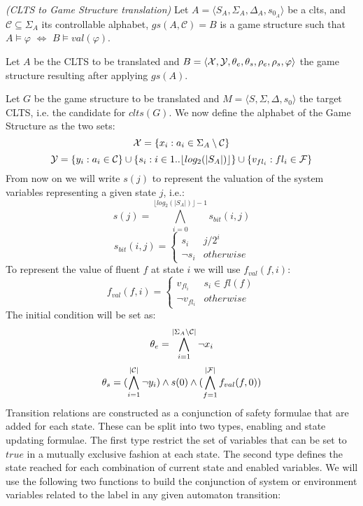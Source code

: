 \begin{definition}
	\label{def:clts_to_gs_translation} \emph{(CLTS to Game Structure translation)} 
	Let $A = \langle S_A, \Sigma_A, \Delta_A, s_{0_A} \rangle$ be a clts, and $\mathcal{C}\subseteq \Sigma_A$ its controllable alphabet, $gs(A,\mathcal{C})=B$ is a game structure such that $A \models \varphi$ $\iff$ $B \models val(\varphi)$.
\end{definition}

Let $A$ be the CLTS to be translated and $B =  \langle {\mathcal{X}}, {\mathcal{Y}}, {\theta_e}, {\theta_s}, {\rho_e}, {\rho_s}, \varphi \rangle$ the game structure resulting after applying $gs(A)$. 

Let $G$ be the game structure to be translated and $M=\langle S, \Sigma, \Delta, s_0 \rangle$ the target CLTS, i.e. the candidate for $clts(G)$.  We now define the alphabet of the Game Structure as the two sets:
\[{\mathcal{X}} = \{x_i : a_i \in \Sigma_A \setminus \mathcal{C} \}\]
\[{\mathcal{Y}} = \{y_i : a_i \in \mathcal{C} \} \cup \{s_i : i \in 1..\lfloor log_2(|S_A|)\rfloor \} \cup \{v_{fl_i} : fl_i \in \mathcal{F}\}\]
From now on we will write $s(j)$ to represent the valuation of the system variables representing a given state $j$, i.e.: 
\[s(j) = \bigwedge\limits^{\lfloor log_2(|S_A|)\rfloor - 1}_{i=0}  s_{bit}(i,j)\]
\[
s_{bit}(i,j) = \begin{cases}
s_i & j / 2^i \\
\neg s_i & otherwise
\end{cases}
\]
To represent the value of fluent $f$ at state $i$ we will use $f_{val}(f,i)$:
\[
f_{val}(f,i) = \begin{cases}
v_{fl_i} & s_i \in fl(f) \\
\neg v_{fl_i} & otherwise
\end{cases}
\]
The initial condition will be set as:
\[{\theta_e} = \bigwedge_{i = 1}^{|\Sigma_A \setminus \mathcal{C}|}\neg x_i\]
\[{\theta_s} = (\bigwedge_{i = 1}^{|\mathcal{C}|}\neg y_i) \wedge s(0) \wedge (\bigwedge_{f = 1}^{|\mathcal{F}|}f_{val}(f,0))\]
Transition relations are constructed as a conjunction of safety formulae that are added for each state. These can be split into two types, enabling and state updating formulae. The first type restrict the set of variables that can be set to $true$ in a mutually exclusive fashion at each state. The second type defines the state reached for each combination of current state and enabled variables. 
We will use the following two functions to build the conjunction of system or environment variables related to the label in any given automaton transition:
